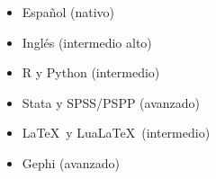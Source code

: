 




\twocolumnsection
{
\begin{itemize}
\vspace{1em}
	\item Español (nativo)
	\item Inglés (intermedio alto)
\end{itemize}}
{
\vspace{1em}
\begin{itemize}
        \item R y Python (intermedio)
	\item Stata y SPSS/PSPP (avanzado)
	\item \LaTeX\ y Lua\LaTeX\ (intermedio)
    \item Gephi (avanzado)
\end{itemize}
}
\\